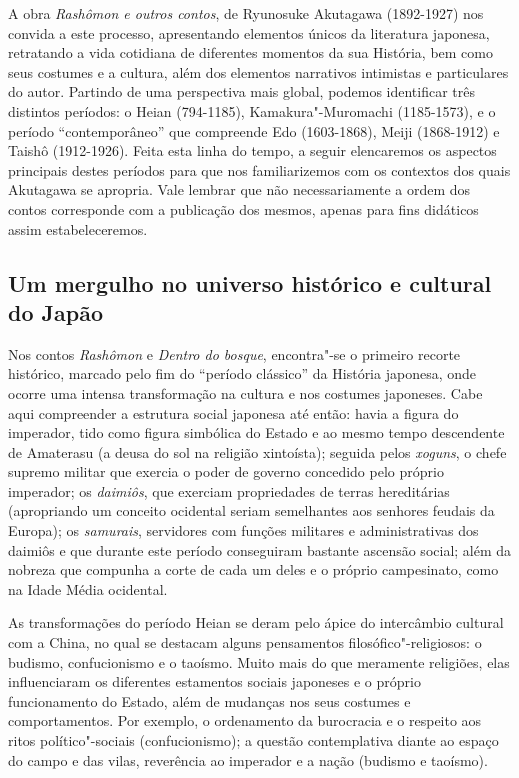 \documentclass[12pt]{extarticle}
\begin{document}
A obra \emph{Rashômon e outros contos}, de Ryunosuke Akutagawa
(1892-1927) nos convida a este processo, apresentando elementos únicos
da literatura japonesa, retratando a vida cotidiana de diferentes
momentos da sua História, bem como seus costumes e a cultura, além dos
elementos narrativos intimistas e particulares do autor. Partindo de uma
perspectiva mais global, podemos identificar três distintos períodos: o
Heian (794-1185), Kamakura"-Muromachi (1185-1573), e o período
``contemporâneo'' que compreende Edo (1603-1868), Meiji (1868-1912) e
Taishô (1912-1926). Feita esta linha do tempo, a seguir elencaremos os
aspectos principais destes períodos para que nos familiarizemos com os
contextos dos quais Akutagawa se apropria. Vale lembrar que não
necessariamente a ordem dos contos corresponde com a publicação dos
mesmos, apenas para fins didáticos assim estabeleceremos.


\subsection{Um mergulho no universo histórico e cultural do Japão}

Nos contos \emph{Rashômon} e \emph{Dentro do bosque}, encontra"-se o
primeiro recorte histórico, marcado pelo fim do ``período clássico'' da
História japonesa, onde ocorre uma intensa transformação na cultura e
nos costumes japoneses. Cabe aqui compreender a estrutura social
japonesa até então: havia a figura do imperador, tido como figura
simbólica do Estado e ao mesmo tempo descendente de Amaterasu (a deusa
do sol na religião xintoísta); seguida pelos \emph{xoguns}, o chefe
supremo militar que exercia o poder de governo concedido pelo próprio
imperador; os \emph{daimiôs}, que exerciam propriedades de terras
hereditárias (apropriando um conceito ocidental seriam semelhantes aos
senhores feudais da Europa); os \emph{samurais}, servidores com funções
militares e administrativas dos daimiôs e que durante este período
conseguiram bastante ascensão social; além da nobreza que compunha a
corte de cada um deles e o próprio campesinato, como na Idade Média
ocidental.

As transformações do período Heian se deram pelo ápice do intercâmbio
cultural com a China, no qual se destacam alguns pensamentos
filosófico"-religiosos: o budismo, confucionismo e o taoísmo. Muito mais
do que meramente religiões, elas influenciaram os diferentes estamentos
sociais japoneses e o próprio funcionamento do Estado, além de mudanças
nos seus costumes e comportamentos. Por exemplo, o ordenamento da
burocracia e o respeito aos ritos político"-sociais (confucionismo); a
questão contemplativa diante ao espaço do campo e das vilas, reverência
ao imperador e a nação (budismo e taoísmo).
\end{document}
